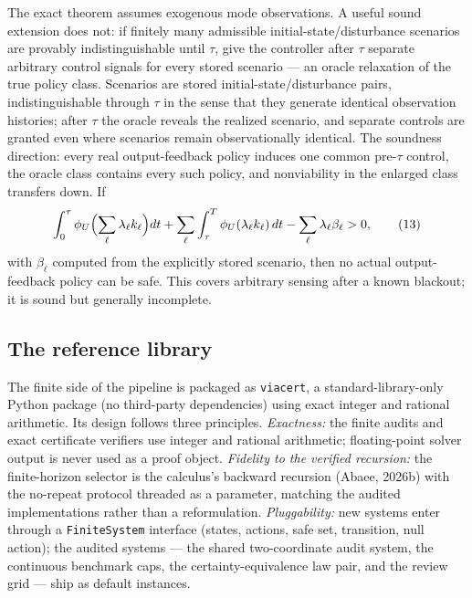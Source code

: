 \documentclass[10pt,twocolumn]{article}
\theoremstyle{plain}
\theoremstyle{definition}
\theoremstyle{remark}
\begin{document}
The exact theorem assumes exogenous mode observations. A useful sound
extension does not: if finitely many admissible initial-state/disturbance
scenarios are provably indistinguishable until \(\tau\), give the controller
after \(\tau\) separate arbitrary control signals for every stored scenario
--- an oracle relaxation of the true policy class. Scenarios are stored
initial-state/disturbance pairs, indistinguishable through \(\tau\) in
the sense that they generate identical observation histories; after
\(\tau\) the oracle reveals the realized scenario, and separate controls
are granted even where scenarios remain observationally identical. The
soundness direction: every real output-feedback policy induces one common
pre-\(\tau\) control, the oracle class contains every such policy, and
nonviability in the enlarged class transfers down. If
\[
\int_0^\tau \phi_U\Bigl(\sum_\ell \lambda_\ell k_\ell\Bigr) dt
+ \sum_\ell \int_\tau^T \phi_U(\lambda_\ell k_\ell)\, dt
- \sum_\ell \lambda_\ell \beta_\ell > 0,
\tag{13}
\]
with \(\beta_\ell\) computed from the explicitly stored scenario, then no
actual output-feedback policy can be safe. This covers arbitrary sensing
after a known blackout; it is sound but generally incomplete.

\subsection{The reference library}\label{library}

The finite side of the pipeline is packaged as \texttt{viacert}, a
standard-library-only Python package (no third-party dependencies) using
exact integer and rational arithmetic.
Its design follows three principles. \emph{Exactness:} the finite audits and exact certificate verifiers use
integer and rational arithmetic; floating-point solver output is never used
as a proof object.
\emph{Fidelity to the verified recursion:} the finite-horizon selector is the
calculus's backward recursion (Abaee, 2026b) with the no-repeat protocol
threaded as a parameter, matching the audited implementations rather than a
reformulation. \emph{Pluggability:} new systems enter through a
\texttt{FiniteSystem} interface (states, actions, safe set, transition, null
action); the audited systems --- the shared two-coordinate audit system, the
continuous benchmark caps, the certainty-equivalence law pair, and the
review grid --- ship as default instances.
\end{document}

